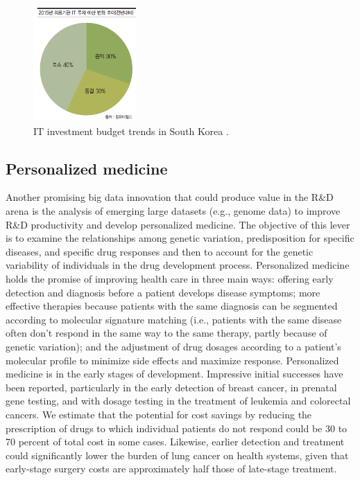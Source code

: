 \documentclass[twocolumn]{article}
\begin{document}
\begin{figure}[htb]
        \centering
        \includegraphics[width=0.35\textwidth]{rnd-trends.png}
        \caption{IT investment budget trends in South Korea \cite{Hong:2015}.}
        \label{fig:budget}
\end{figure}

\subsection{Personalized medicine}
Another promising big data innovation that could produce value in the R\&D arena is the analysis of emerging large datasets (e.g., genome data) to improve R\&D productivity and develop personalized medicine. The objective of this lever is to examine the relationships among genetic variation, predisposition for specific diseases, and specific drug responses and then to account for the genetic variability of individuals in the drug development process.
Personalized medicine holds the promise of improving health care in three main ways: offering early detection and diagnosis before a patient develops disease symptoms; more effective therapies because patients with the same diagnosis can be segmented according to molecular signature matching (i.e., patients with the same disease often don’t respond in the same way to the same therapy, partly because of genetic variation); and the adjustment of drug dosages according to a patient’s molecular profile to minimize side effects and maximize response.
Personalized medicine is in the early stages of development. Impressive initial successes have been reported, particularly in the early detection of breast cancer, in prenatal gene testing, and with dosage testing in the treatment of leukemia and colorectal cancers. We estimate that the potential for cost savings by reducing the prescription of drugs to which individual patients do not respond could be 30 to 70 percent of total cost in some cases. Likewise, earlier detection and treatment could significantly lower the burden of lung cancer on health systems, given that early-stage surgery costs are approximately half those of late-stage treatment.
\end{document}
